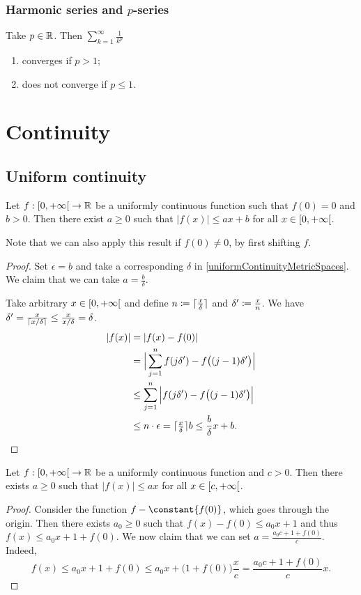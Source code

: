 \subsubsection{Harmonic series and $p$-series}
\begin{proposition} \label{pseriesConvergence}
Take $p\in \mathbb{R}$. Then $\sum_{k=1}^\infty \frac{1}{k^p}$
\begin{enumerate}
\item converges if $p > 1$;
\item does not converge if $p\leq 1$.
\end{enumerate}
\end{proposition}



\section{Continuity}
\subsection{Uniform continuity}
\begin{lemma} \label{affineBoundUniformlyContinuousFunction}
Let $f: \interval[co]{0,+\infty}\to \R$ be a uniformly continuous function such that $f(0) = 0$ and $b > 0$. Then there exist $a\geq 0$ such that $|f(x)| \leq ax+b$ for all $x\in \interval[co]{0,+\infty}$.
\end{lemma}
Note that we can also apply this result if $f(0) \neq 0$, by first shifting $f$.
\begin{proof}
Set $\epsilon = b$ and take a corresponding $\delta$ in \ref{uniformContinuityMetricSpaces}. We claim that we can take $a = \frac{b}{\delta}$.

Take arbitrary $x\in \interval[co]{0,+\infty}$ and define $n \coloneqq \lceil\frac{x}{\delta}\rceil$ and $\delta' \coloneqq \frac{x}{n}$. We have $\delta' = \frac{x}{\lceil x/\delta\rceil} \leq \frac{x}{x/\delta} = \delta$.
\begin{align*}
|f(x)| &= |f(x) - f(0)| \\
&= \Big|\sum_{j= 1}^{n} f(j\delta') - f\big((j-1)\delta'\big) \Big| \\
&\leq \sum_{j= 1}^{n} \Big|f(j\delta') - f\big((j-1)\delta'\big) \Big| \\
&\leq n\cdot \epsilon = \lceil\tfrac{x}{\delta}\rceil b \leq \frac{b}{\delta}x + b.
\end{align*}
\end{proof}
\begin{corollary} \label{linearBoundUniformlyContinuousFunction}
Let $f: \interval[co]{0,+\infty}\to \R$ be a uniformly continuous function and $c > 0$. Then there exists $a\geq 0$ such that $|f(x)| \leq ax$ for all $x\in \interval[co]{c,+\infty}$.
\end{corollary}
\begin{proof}
Consider the function $f- \constant{f(0)}$, which goes through the origin. Then there exists $a_0 \geq 0$ such that $f(x) - f(0) \leq a_0 x + 1$ and thus $f(x) \leq a_0 x + 1 + f(0)$. We now claim that we can set $a = \frac{a_0c + 1 + f(0)}{c}$. Indeed,
\[ f(x) \leq a_0 x + 1 + f(0) \leq  a_0 x + \big(1 + f(0)\big)\frac{x}{c} = \frac{a_0c + 1 + f(0)}{c}x. \]
\end{proof}

